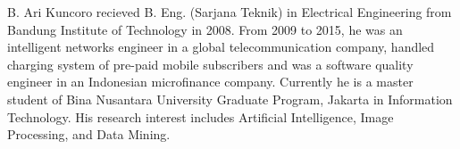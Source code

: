 \documentclass[conference]{IEEEtran}
\begin{document}








% 

\begin{IEEEbiographynophoto}{B. Ari Kuncoro}
recieved B. Eng. (Sarjana Teknik) in Electrical Engineering from Bandung Institute of Technology in 2008. From 2009 to 2015, he was an intelligent networks engineer in a global telecommunication company, handled charging system of pre-paid mobile subscribers and was a software quality engineer in an Indonesian microfinance company. Currently he is a master student of Bina Nusantara University Graduate Program, Jakarta in Information Technology. His research interest includes Artificial Intelligence, Image Processing, and Data Mining. 
\end{IEEEbiographynophoto}
\end{document}
